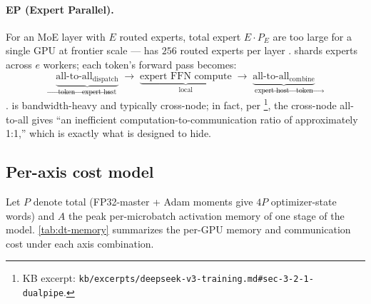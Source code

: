 \paragraph{EP (Expert Parallel).} For an MoE layer with $E$ routed
experts, total expert  $E \cdot P_E$ are too large for a
single GPU at frontier scale ---  has $256$ routed experts
per layer \citep[\S 3.2]{deepseek-v3}.  shards experts across $e$
workers; each token's forward pass becomes:
\begin{equation}
\underbrace{\text{all-to-all}_{\text{dispatch}}}_{\text{token}\to\text{expert host}}
\;\to\;
\underbrace{\text{expert FFN compute}}_{\text{local}}
\;\to\;
\underbrace{\text{all-to-all}_{\text{combine}}}_{\text{expert host}\to\text{token}}
\label{eq:ep-pattern}
\end{equation}
\citep[\S 3.2; \S 3.2.2]{deepseek-v3}.  is bandwidth-heavy and
typically cross-node; in fact, per
\citet[\S 3.2.1]{deepseek-v3}\footnote{KB excerpt:
\nolinkurl{kb/excerpts/deepseek-v3-training.md#sec-3-2-1-dualpipe}.}, the
cross-node  all-to-all gives  ``an inefficient
computation-to-communication ratio of approximately 1:1,'' which is
exactly what  is designed to hide.

\subsection{Per-axis cost model}
\label{sec:dt-cost-model}

Let $P$ denote total  (FP32-master + Adam moments give $4P$
optimizer-state words) and $A$ the peak per-microbatch activation
memory of one stage of the model. \cref{tab:dt-memory} summarizes the
per-GPU memory and communication cost under each axis combination.


